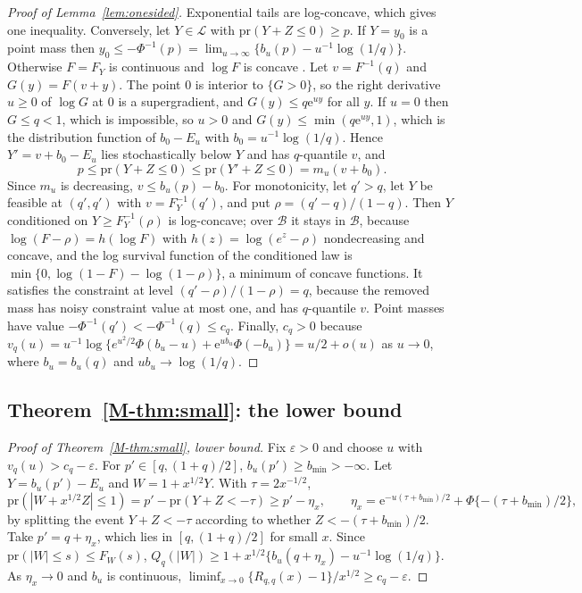 \documentclass[11pt]{article}
\renewcommand{\_}{\usc\allowbreak}
\newcommand{\pr}{\mathrm{pr}}
\newcommand{\LC}{\mathcal{L}}
\begin{document}
\begin{proof}[Proof of Lemma~\ref{lem:onesided}]
Exponential tails are log-concave, which gives one inequality. Conversely, let $Y \in \LC$ with $\pr(Y + Z \le 0) \ge p$. If $Y = y_0$ is a point mass then $y_0 \le -\Phi^{-1}(p) = \lim_{u\to\infty}\{b_u(p) - u^{-1}\log(1/q)\}$. Otherwise $F = F_Y$ is continuous and $\log F$ is concave \citep{prekopa1973}. Let $v = F^{-1}(q)$ and $G(y) = F(v + y)$. The point $0$ is interior to $\{G > 0\}$, so the right derivative $u \ge 0$ of $\log G$ at $0$ is a supergradient, and $G(y) \le q \mathrm{e}^{uy}$ for all $y$. If $u = 0$ then $G \le q < 1$, which is impossible, so $u > 0$ and $G(y) \le \min(q\mathrm{e}^{uy}, 1)$, which is the distribution function of $b_0 - E_u$ with $b_0 = u^{-1}\log(1/q)$. Hence $Y' = v + b_0 - E_u$ lies stochastically below $Y$ and has $q$-quantile $v$, and
\[
p \le \pr(Y + Z \le 0) \le \pr(Y' + Z \le 0) = m_u(v + b_0).
\]
Since $m_u$ is decreasing, $v \le b_u(p) - b_0$. For monotonicity, let $q' > q$, let $Y$ be feasible at $(q', q')$ with $v = F_Y^{-1}(q')$, and put $\rho = (q' - q)/(1-q)$. Then $Y$ conditioned on $Y \ge F_Y^{-1}(\rho)$ is log-concave; over $\mathcal B$ it stays in $\mathcal B$, because $\log(F - \rho) = h(\log F)$ with $h(z) = \log(e^z - \rho)$ nondecreasing and concave, and the log survival function of the conditioned law is $\min\{0, \log(1-F) - \log(1-\rho)\}$, a minimum of concave functions. It satisfies the constraint at level $(q' - \rho)/(1-\rho) = q$, because the removed mass has noisy constraint value at most one, and has $q$-quantile $v$. Point masses have value $-\Phi^{-1}(q') < -\Phi^{-1}(q) \le c_q$. Finally, $c_q > 0$ because $v_q(u) = u^{-1}\log\{e^{u^2/2}\Phi(b_u - u) + \mathrm{e}^{u b_u}\Phi(-b_u)\} = u/2 + o(u)$ as $u \to 0$, where $b_u = b_u(q)$ and $u b_u \to \log(1/q)$.
\end{proof}

\subsection*{Theorem~\ref{M-thm:small}: the lower bound}

\begin{proof}[Proof of Theorem~\ref{M-thm:small}, lower bound]
Fix $\varepsilon > 0$ and choose $u$ with $v_q(u) > c_q - \varepsilon$. For $p' \in [q, (1+q)/2]$, $b_u(p') \ge b_{\min} > -\infty$. Let $Y = b_u(p') - E_u$ and $W = 1 + x^{1/2}Y$. With $\tau = 2x^{-1/2}$,
\[
\pr(|W+x^{1/2}Z| \le 1) = p' - \pr(Y + Z < -\tau) \ge p' - \eta_x, \qquad \eta_x = \mathrm{e}^{-u(\tau + b_{\min})/2} + \Phi\{-(\tau + b_{\min})/2\},
\]
by splitting the event $Y + Z < -\tau$ according to whether $Z < -(\tau + b_{\min})/2$. Take $p' = q + \eta_x$, which lies in $[q, (1+q)/2]$ for small $x$. Since $\pr(|W| \le s) \le F_W(s)$, $Q_q(|W|) \ge 1 + x^{1/2}\{b_u(q + \eta_x) - u^{-1}\log(1/q)\}$. As $\eta_x \to 0$ and $b_u$ is continuous, $\liminf_{x\to0}\{R_{q,q}(x) - 1\}/x^{1/2} \ge c_q - \varepsilon$.
\end{proof}
\end{document}
